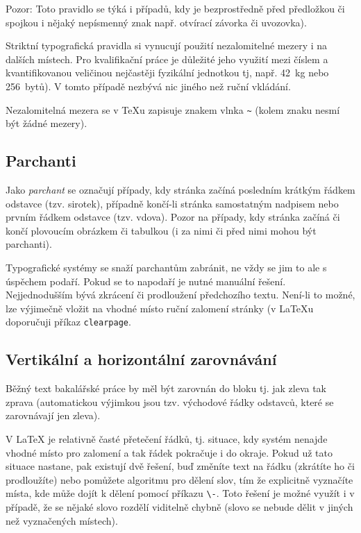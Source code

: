 \documentclass[male,czech,api_bc]{kitheses}
\begin{document}
Pozor: Toto pravidlo se týká i případů, kdy je bezprostředně před předložkou či spojkou i nějaký nepísmenný znak např. otvírací závorka či uvozovka).

Striktní typografická pravidla si vynucují použití nezalomitelné mezery i na dalších místech. Pro kvalifikační práce je důležité jeho využití mezi číslem a kvantifikovanou veličinou nejčastěji fyzikální jednotkou tj, např. 42~kg nebo 256~bytů). V tomto případě nezbývá nic jiného než ruční vkládání.

Nezalomitelná mezera se v \TeX{}u zapisuje znakem vlnka \texttt{\textasciitilde} (kolem znaku nesmí být žádné mezery).

\subsection{Parchanti}

Jako \textit{parchant} se označují případy, kdy stránka začíná posledním krátkým řádkem odstavce (tzv. sirotek), případně končí-li stránka samostatným nadpisem nebo prvním řádkem odstavce (tzv. vdova). Pozor na případy, kdy stránka začíná či končí plovoucím obrázkem či tabulkou (i za nimi či před nimi mohou být parchanti).

Typografické systémy se snaží parchantům zabránit, ne vždy se jim to ale s úspěchem podaří. Pokud se to napodaří je nutné manuální řešení. Nejjednodušším bývá zkrácení či prodloužení předchozího textu. Není-li to možné, lze výjimečně vložit na vhodné místo ruční zalomení stránky (v \LaTeX{}u doporučuji příkaz \verb!clearpage!.

\subsection{Vertikální a horizontální zarovnávání}

Běžný text bakalářské práce by měl být zarovnán do bloku tj. jak zleva tak zprava (automatickou výjimkou jsou tzv. východové řádky odstavců, které se zarovnávají jen zleva).

V \LaTeX{} je relativně časté přetečení řádků, tj. situace, kdy systém nenajde vhodné místo pro zalomení a tak řádek pokračuje i do okraje. Pokud už tato situace nastane, pak existují dvě řešení, buď změníte text na řádku (zkrátíte ho či prodloužíte) nebo pomůžete algoritmu pro dělení slov, tím že explicitně vyznačíte místa, kde může dojít k dělení pomocí příkazu \verb!\-!. Toto řešení je možné využít i v případě, že se nějaké slovo rozdělí viditelně chybně (slovo se nebude dělit v jiných než vyznačených místech).
\end{document}
